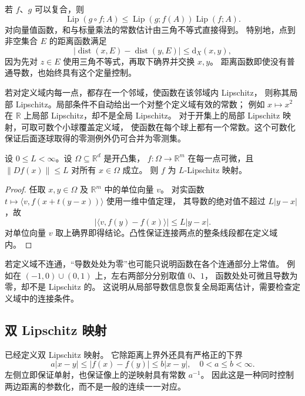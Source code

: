 \ProseParagraphBreak

若 \(f\)、\(g\) 可以复合，则
\[
 \operatorname{Lip}(g\circ f;A)
 \leq\operatorname{Lip}(g;f(A))\operatorname{Lip}(f;A).
\]
对向量值函数，和与标量乘法的常数估计由三角不等式直接得到。
特别地，点到非空集合 \(E\) 的距离函数满足
\[
 \bigl|\operatorname{dist}(x,E)-\operatorname{dist}(y,E)\bigr|
 \leq \mathrm{d}_X(x,y),
\]
因为先对 \(z\in E\) 使用三角不等式，再取下确界并交换 \(x,y\)。
距离函数即使没有普通导数，也始终具有这个定量控制。

\ProseParagraphBreak

若对定义域内每一点，都存在一个邻域，使函数在该邻域内 Lipschitz，
则称其局部 Lipschitz。局部条件不自动给出一个对整个定义域有效的常数；
例如 \(x\mapsto x^2\) 在 \(\mathbb R\) 上局部 Lipschitz，却不是全局 Lipschitz。
对于开集上的局部 Lipschitz 映射，可取可数个小球覆盖定义域，
使函数在每个球上都有一个常数。这个可数化保证后面逐球取得的零测例外仍可合并为零测集。

\begin{proposition}\label{b1:prop:bounded-derivative-lipschitz}
设 \(0\le L<\infty\)。设 \(\Omega\subseteq\mathbb R^d\) 是开凸集，
\(f:\Omega\rightarrow\mathbb R^m\) 在每一点可微，且
\(\|Df(x)\|\leq L\) 对所有 \(x\in\Omega\) 成立。
则 \(f\) 为 \(L\)-Lipschitz 映射。
\end{proposition}
\begin{proof}
任取 \(x,y\in\Omega\) 及 \(\mathbb R^m\) 中的单位向量 \(v\)。
对实函数 \(t\mapsto\langle v,f(x+t(y-x))\rangle\) 使用一维中值定理，
其导数的绝对值不超过 \(L|y-x|\)，故
\[
 |\langle v,f(y)-f(x)\rangle|\leq L|y-x|.
\]
对单位向量 \(v\) 取上确界即得结论。凸性保证连接两点的整条线段都在定义域内。
\end{proof}

若定义域不连通，“导数处处为零”也可能只说明函数在各个连通部分上常值。
例如在 \((-1,0)\cup(0,1)\) 上，左右两部分分别取值 \(0\)、\(1\)，
函数处处可微且导数为零，却不是 Lipschitz 的。
这说明从局部导数信息恢复全局距离估计，需要检查定义域中的连接条件。

\subsection{双 Lipschitz 映射}
\label{b1:subsec:160102}

已经定义双 Lipschitz 映射。
它除距离上界外还具有严格正的下界
\[
 a|x-y|\leq|f(x)-f(y)|\leq b|x-y|,
 \quad0<a\leq b<\infty.
\]
左侧立即保证单射，也保证像上的逆映射具有常数 \(a^{-1}\)。
因此这是一种同时控制两边距离的参数化，而不是一般的连续一一对应。

